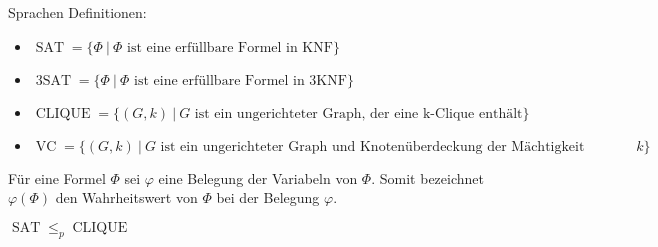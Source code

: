 Sprachen Definitionen:
\begin{itemize}
  \item \(\operatorname{SAT} = \{ \Phi \ |\ \Phi \text{ ist eine erfüllbare Formel in KNF} \} \)
  \item \(\operatorname{3SAT} = \{ \Phi \ |\ \Phi \text{ ist eine erfüllbare Formel in 3KNF} \} \)
  \item \(\operatorname{CLIQUE} = \{ (G, k) \ |\ G \text{ ist ein ungerichteter Graph, der eine k-Clique enthält} \} \)
  \item \(\operatorname{VC} = \{ (G, k) \ |\ G \text{ ist ein ungerichteter Graph und Knotenüberdeckung der Mächtigkeit höchstens } k \} \)
\end{itemize}

Für eine Formel \(\Phi\) sei \(\varphi\) eine Belegung der Variabeln von \(\Phi\). Somit bezeichnet \(\varphi(\Phi)\) den Wahrheitswert von \(\Phi\) bei der Belegung \(\varphi\).\\

\begin{lemma}
\(\operatorname{SAT} \leq_p \operatorname{CLIQUE}\)
\end{lemma}

